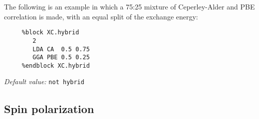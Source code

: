 \documentclass[11pt]{article}
\begin{document}
\begin{description}
The following is an example in which a 75:25 mixture of Ceperley-Alder
and PBE correlation is made, with an equal split of the exchange
energy:

\begin{verbatim}
     %block XC.hybrid
        2
        LDA CA  0.5 0.75
        GGA PBE 0.5 0.25
     %endblock XC.hybrid
\end{verbatim}

{\it Default value:} {\tt not hybrid}


\end{description}

\vspace{5pt}
\subsection{Spin polarization}
\end{document}
